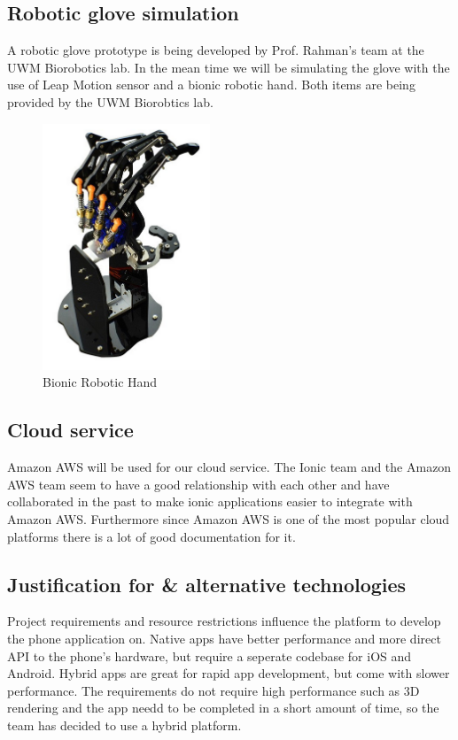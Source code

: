 \documentclass[a4paper,10pt]{article}
\begin{document}
    \subsection{Robotic glove simulation}
        A robotic glove prototype is being developed by Prof. Rahman's team at the UWM Biorobotics lab. In the mean time we will be simulating the glove with the use of Leap Motion sensor and a bionic robotic hand. Both items are being provided by the UWM Biorobtics lab.
        \begin{figure}[h]
         \centering
         \includegraphics[width=50mm, scale=0.1]{bionicRoboticHand}
         \caption{Bionic Robotic Hand}
        \end{figure}
        
    \subsection{Cloud service}
        Amazon AWS will be used for our cloud service. The Ionic team and the Amazon AWS team seem to have a good relationship with each other and have collaborated in the past to make ionic applications easier to integrate with Amazon AWS. Furthermore since Amazon AWS is one of the most popular cloud platforms there is a lot of good documentation for it. 
        
    \subsection{Justification for \& alternative technologies}
        Project requirements and resource restrictions influence the platform to develop the phone application on. Native apps have better performance and more direct API to the phone's hardware, but require a seperate codebase for iOS and Android. Hybrid apps are great for rapid app development, but come with slower performance. The requirements do not require high performance such as 3D rendering and the app needd to be completed in a short amount of time, so the team has decided to use a hybrid platform.
\end{document}
